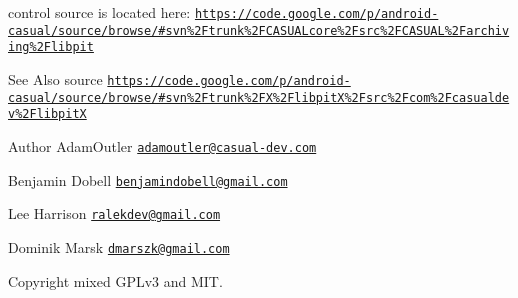 control source is located here\-: \href{https://code.google.com/p/android-casual/source/browse/#svn%2Ftrunk%2FCASUALcore%2Fsrc%2FCASUAL%2Farchiving%2Flibpit}{\tt https\-://code.\-google.\-com/p/android-\/casual/source/browse/\#svn\%2\-Ftrunk\%2\-F\-C\-A\-S\-U\-A\-Lcore\%2\-Fsrc\%2\-F\-C\-A\-S\-U\-A\-L\%2\-Farchiving\%2\-Flibpit} \begin{DoxySeeAlso}{See Also}
source \href{https://code.google.com/p/android-casual/source/browse/#svn%2Ftrunk%2FX%2FlibpitX%2Fsrc%2Fcom%2Fcasualdev%2FlibpitX}{\tt https\-://code.\-google.\-com/p/android-\/casual/source/browse/\#svn\%2\-Ftrunk\%2\-F\-X\%2\-Flibpit\-X\%2\-Fsrc\%2\-Fcom\%2\-Fcasualdev\%2\-Flibpit\-X} 
\end{DoxySeeAlso}
\begin{DoxyAuthor}{Author}
Adam\-Outler \href{mailto:adamoutler@casual-dev.com}{\tt adamoutler@casual-\/dev.\-com} 

Benjamin Dobell \href{mailto:benjamindobell@gmail.com}{\tt benjamindobell@gmail.\-com} 

Lee Harrison \href{mailto:ralekdev@gmail.com}{\tt ralekdev@gmail.\-com} 

Dominik Marsk \href{mailto:dmarszk@gmail.com}{\tt dmarszk@gmail.\-com} 
\end{DoxyAuthor}
\begin{DoxyCopyright}{Copyright}
mixed G\-P\-Lv3 and M\-I\-T. 
\end{DoxyCopyright}
